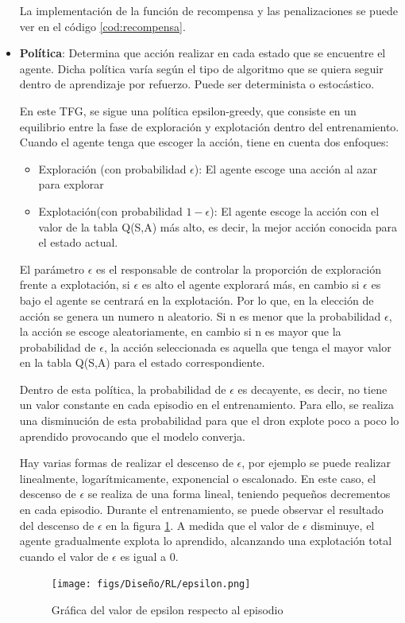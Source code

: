 \begin{itemize}
      La implementación de la función de recompensa y las penalizaciones se puede ver en el código \ref{cod:recompensa}.   
    \item \textbf{Política}: Determina que acción realizar en cada estado que se encuentre el agente. Dicha política varía según el tipo de algoritmo que se quiera seguir 
    dentro de aprendizaje por refuerzo. Puede ser determinista o estocástico.

    En este TFG, se sigue una política epsilon-greedy\cite{Epsilon-greedy}, que consiste en un equilibrio entre la fase de exploración y explotación dentro 
    del entrenamiento. Cuando el agente tenga que escoger la acción, tiene en cuenta dos enfoques:
 
 \begin{itemize}
   \item Exploración (con probabilidad $\epsilon$): El agente escoge una acción al azar para explorar
   \item Explotación(con probabilidad $ 1 - \epsilon$): El agente escoge la acción con el valor de la tabla Q(S,A) más alto, es decir, la mejor acción conocida para el estado actual.
 \end{itemize}
 
 El parámetro $\epsilon$ es el responsable de controlar la proporción de exploración frente a explotación, si $\epsilon$ es alto el agente explorará más, en cambio si $\epsilon$ es bajo
 el agente se centrará en la explotación. Por lo que, en la elección de acción se genera un numero n aleatorio. Si n es menor que la probabilidad $\epsilon$, la acción se escoge aleatoriamente, 
 en cambio si n es mayor que la probabilidad de $\epsilon$, la acción seleccionada es aquella que tenga el mayor valor en la tabla Q(S,A) para el estado correspondiente.
 
 Dentro de esta política, la probabilidad de $\epsilon$ es decayente, es decir, no tiene un valor constante en cada episodio en el entrenamiento. Para ello, se realiza una disminución 
 de esta probabilidad para que el dron explote poco a poco lo aprendido provocando que el modelo converja. 
 
 Hay varias formas de realizar el descenso
 de $\epsilon$, por ejemplo se puede realizar linealmente, logarítmicamente, exponencial o escalonado. En este caso, el descenso de $\epsilon$ se realiza 
 de una forma lineal, teniendo pequeños decrementos en cada episodio. Durante el entrenamiento, se puede observar el resultado del descenso de $\epsilon$ en la figura \ref{fig:epsilon}. A medida
 que el valor de $\epsilon$ disminuye, el agente gradualmente explota lo aprendido, alcanzando una explotación total cuando el valor de $\epsilon$ es igual a 0.
 
 \begin{figure} [H]
  \begin{center}
    \texttt{[image: figs/Diseño/RL/epsilon.png]}
  \end{center}
  \caption{Gráfica del valor de epsilon respecto al episodio}
  \label{fig:epsilon}
  \vspace{-1.5em}
\end{figure}
  \end{itemize}

